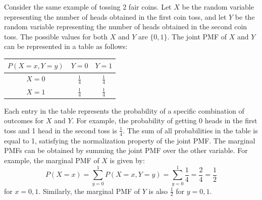 \documentclass[openany]{book}
\begin{document}
\begin{example}
    Consider the same example of tossing 2 fair coins. Let $X$ be the random variable representing the number of heads obtained in the first coin toss, and let $Y$ be the random variable representing the number of heads obtained in the second coin toss. The possible values for both $X$ and $Y$ are $\{0, 1\}$. The joint PMF of $X$ and $Y$ can be represented in a table as follows:
    \begin{table}[H]
        \centering
        \begin{tabular}{c|cc}
            $P(X = x, Y = y)$ & $Y=0$ & $Y=1$ \\
            \hline
            $X=0$ & $\frac{1}{4}$ & $\frac{1}{4}$ \\
            $X=1$ & $\frac{1}{4}$ & $\frac{1}{4}$ \\
        \end{tabular}
    \end{table}
    Each entry in the table represents the probability of a specific combination of outcomes for $X$ and $Y$. For example, the probability of getting 0 heads in the first toss and 1 head in the second toss is $\frac{1}{4}$. The sum of all probabilities in the table is equal to 1, satisfying the normalization property of the joint PMF. The marginal PMFs can be obtained by summing the joint PMF over the other variable. For example, the marginal PMF of $X$ is given by:
    $$P(X = x) = \sum_{y=0}^{1} P(X = x, Y = y) = \sum_{y=0}^{1} \frac{1}{4} = \frac{2}{4} = \frac{1}{2}$$
    for $x = 0, 1$. Similarly, the marginal PMF of $Y$ is also $\frac{1}{2}$ for $y = 0, 1$.
\end{example}
\end{document}
